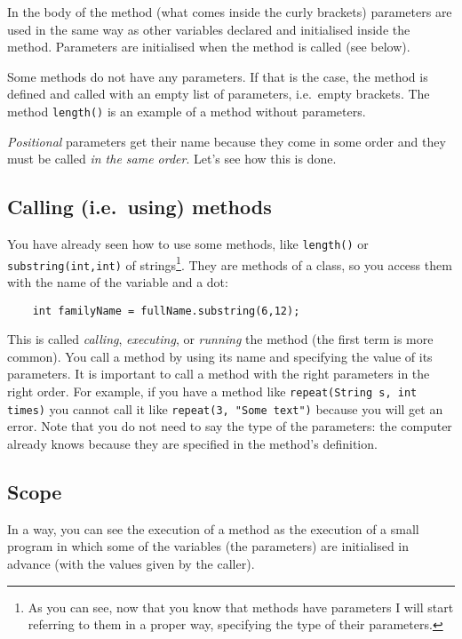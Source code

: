In the body of the method (what comes inside the curly
brackets) parameters are used in the same way 
as other variables declared and
initialised inside the method. Parameters are initialised when the
method is called (see below). 

Some methods do not have any parameters. If that is the case, the
method is defined and called with an empty list of parameters,
i.e.~empty brackets. The method \verb+length()+ is an example of a
method without parameters. 

\emph{Positional} parameters get their name because they come in some
order and they must be called \emph{in the same order}. Let's see how
this is done. 

\subsection{Calling (i.e.~using) methods}
\label{sec:using}

You have already seen how to use some methods, like
\verb+length()+ or \verb+substring(int,int)+ of strings\footnote{As
  you can see, now that you know that methods have parameters I will
  start referring to them in a proper way, specifying the type of
  their parameters.}. They are methods of a
class, so you access them with the name of the variable and a dot: 

\begin{verbatim}
    int familyName = fullName.substring(6,12);
\end{verbatim}

This is called \emph{calling}, \emph{executing}, or \emph{running} the
method (the first term is more common). 
You call a method by using its name and specifying the value of its
parameters. 
It is important to call a
method with the right parameters in the right order. For example, if
you have a method like \verb+repeat(String s, int times)+ you 
cannot call it like \verb+repeat(3, "Some text")+ because you will get
an error. Note that you do not need to say the type of the
parameters: the computer already knows because they are specified in
the method's definition. 

\subsection{Scope}

In a way, you can see the execution of a method as the execution of a
small program in which some of the variables (the parameters) are
initialised in advance (with the values given by the caller). 

